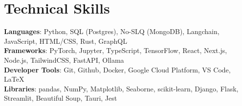 \documentclass[letterpaper,11pt]{article}
\begin{document}
\section{Technical Skills}
 \begin{itemize}[leftmargin=0.15in, label={}]
    \small{\item{
     \textbf{Languages}{: Python, SQL (Postgres), No-SLQ (MongoDB), Langchain, JavaScript, HTML/CSS, Rust, GraphQL} \\
     \textbf{Frameworks}{: PyTorch, Jupyter, TypeScript, TensorFlow, React, Next.js, Node.js, TailwindCSS, FastAPI, Ollama} \\
     \textbf{Developer Tools}{: Git, Github, Docker, Google Cloud Platform, VS Code, \LaTeX} \\
     \textbf{Libraries}{: pandas, NumPy, Matplotlib, Seaborne, scikit-learn, Django, Flask, Streamlit, Beautiful Soup, Tauri, Jest} \\
    }}
 \end{itemize}
\end{document}
